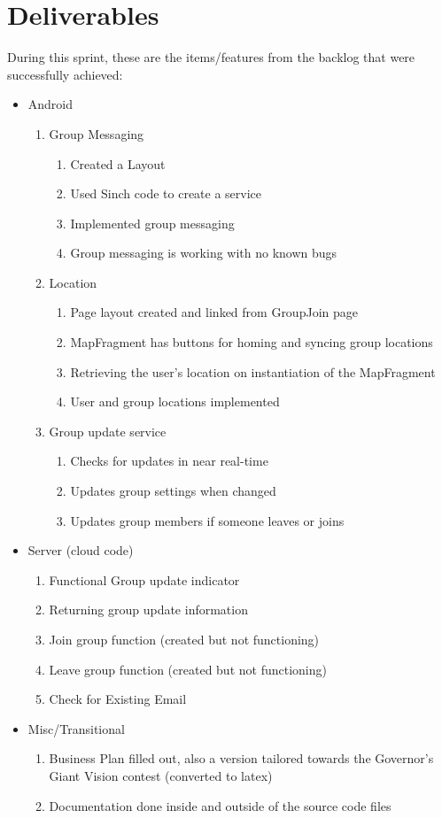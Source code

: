 \documentclass[11pt]{article}
\begin{document}
\section*{Deliverables}
During this sprint, these are the items/features from the backlog that were successfully achieved:
	\begin{itemize}
	\item Android
		\begin{enumerate}
		\item Group Messaging
			\begin{enumerate}
			\item Created a Layout
			\item Used Sinch code to create a service
			\item Implemented group messaging
			\item Group messaging is working with no known bugs
			\end{enumerate}
		\item Location
			\begin{enumerate}
			\item Page layout created and linked from GroupJoin page
			\item MapFragment has buttons for homing and syncing group locations
			\item Retrieving the user's location on instantiation of the MapFragment
			\item User and group locations implemented
			\end{enumerate}
		\item Group update service
			\begin{enumerate}
			\item Checks for updates in near real-time
			\item Updates group settings when changed
			\item Updates group members if someone leaves or joins
			\end{enumerate}
		\end{enumerate}

	\item Server (cloud code)
		\begin{enumerate}
			\item Functional Group update indicator
			\item Returning group update information
			\item Join group function (created but not functioning)
			\item Leave group function (created but not functioning)
			\item Check for Existing Email
		\end{enumerate}
		
	\item Misc/Transitional
		\begin{enumerate}
			\item Business Plan filled out, also a version tailored towards the Governor's Giant Vision contest (converted to latex)
			\item Documentation done inside and outside of the source code files
		\end{enumerate}

	\end{itemize}
\end{document}
